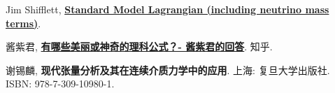 \documentclass{article}
\begin{document}
\begin{thebibliography}{99}
    \newblock Jim Shifflett,
    \newblock \href{http://einstein-schrodinger.com/Standard_Model.pdf}%
                   {\textbf{Standard Model Lagrangian (including neutrino mass terms)}}.

    \newblock 酱紫君,
    \newblock \href{https://www.zhihu.com/question/26292855/answer/266846441}%
                   {\textbf{有哪些美丽或神奇的理科公式？- 酱紫君的回答}}.
    \newblock 知乎.

    \newblock 谢锡麟,
    \newblock \textbf{现代张量分析及其在连续介质力学中的应用}.
    \newblock 上海: 复旦大学出版社.
    \newblock ISBN: 978-7-309-10980-1.
\end{thebibliography}
\end{document}
